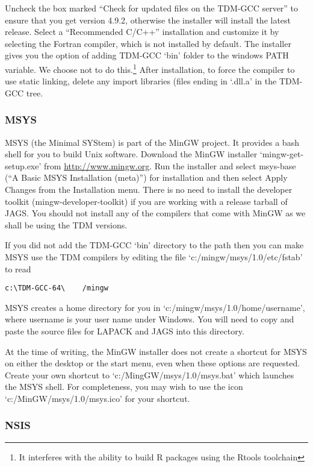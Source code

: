 \documentclass[11pt, a4paper, titlepage]{article}
\newcommand{\JAGS}{\textsf{JAGS}}
\newcommand{\code}[1]{{\bgroup{\normalfont\ttfamily #1}\egroup}}
\newcommand{\file}[1]{{`\normalfont\textsf{#1}'}}
\begin{document}
Uncheck the box marked ``Check for updated files on the TDM-GCC
server'' to ensure that you get version 4.9.2, otherwise the installer
will install the latest release.  Select a ``Recommended C/C++''
installation and customize it by selecting the Fortran compiler, which
is not installed by default. The installer gives you the option of
adding TDM-GCC \file{bin} folder to the windows PATH variable. We
choose not to do this.\footnote{It interferes with the ability to
  build R packages using the Rtools toolchain} After installation,
to force the compiler to use static linking, delete any import
libraries (files ending in \file{.dll.a} in the TDM-GCC tree.

\subsubsection{MSYS}

MSYS (the Minimal SYStem) is part of the MinGW project. It provides a
bash shell for you to build Unix software. Download the MinGW
installer \file{mingw-get-setup.exe} from \url{http://www.mingw.org}.
Run the installer and select \code{msys-base} (``A Basic MSYS
Installation (meta)'') for installation and then select \code{Apply
  Changes} from the \code{Installation} menu. There is no need to
install the developer toolkit (\code{mingw-developer-toolkit}) if you
are working with a release tarball of \JAGS.  You should not install
any of the compilers that come with MinGW as we shall be using the TDM
versions.

If you did not add the TDM-GCC \file{bin} directory to the path then
you can make MSYS use the TDM compilers by editing the file
\file{c:/mingw/msys/1.0/etc/fstab} to read
\begin{verbatim}
c:\TDM-GCC-64\    /mingw
\end{verbatim}

MSYS creates a home directory for you in
\file{c:/mingw/msys/1.0/home/username}, where \code{username} is your
user name under Windows. You will need to copy and paste the source
files for LAPACK and JAGS into this directory.

At the time of writing, the MinGW installer does not create a shortcut
for MSYS on either the desktop or the start menu, even when these
options are requested. Create your own shortcut to
\file{c:/MingGW/msys/1.0/msys.bat} which launches the MSYS shell. For
completeness, you may wish to use the icon
\file{c:/MinGW/msys/1.0/msys.ico} for your shortcut.

\subsubsection{NSIS}
\end{document}
